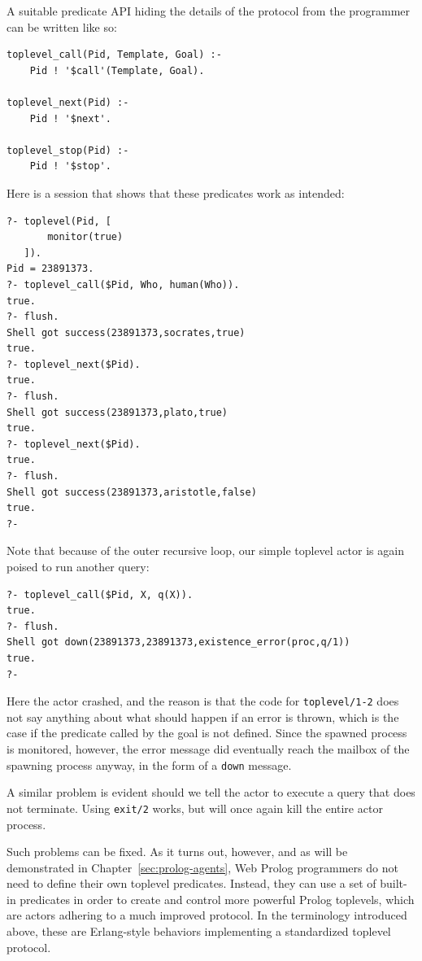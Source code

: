 \noindent A suitable predicate API hiding the details of the protocol from the programmer can be written like so:

\begin{verbatim}
toplevel_call(Pid, Template, Goal) :-
    Pid ! '$call'(Template, Goal).

toplevel_next(Pid) :-
    Pid ! '$next'.

toplevel_stop(Pid) :-
    Pid ! '$stop'.
\end{verbatim} 

\noindent Here is a session that shows that these predicates work as intended:

\begin{verbatim}
?- toplevel(Pid, [
       monitor(true)
   ]).
Pid = 23891373.
?- toplevel_call($Pid, Who, human(Who)).
true.
?- flush.
Shell got success(23891373,socrates,true)
true.
?- toplevel_next($Pid).
true.
?- flush.
Shell got success(23891373,plato,true)
true.
?- toplevel_next($Pid).
true.
?- flush.
Shell got success(23891373,aristotle,false)
true.
?-
\end{verbatim}

\noindent Note that because of the outer recursive loop, our simple toplevel actor is again poised to run another query:

\begin{verbatim}
?- toplevel_call($Pid, X, q(X)).
true.
?- flush.
Shell got down(23891373,23891373,existence_error(proc,q/1))
true.
?-
\end{verbatim}

\noindent Here the actor crashed, and the reason is that the code for \texttt{toplevel/1-2} does not say anything about what should happen if an error is thrown, which is the case if the predicate called by the goal is not defined. Since the spawned process is monitored, however, the error message did eventually reach the mailbox of the spawning process anyway, in the form of a \texttt{down} message.

A similar problem is evident should we tell the actor to execute a query that does not terminate. Using \texttt{exit/2} works, but will once again kill the entire actor process.

Such problems can be fixed. As it turns out, however, and as will be demonstrated in Chapter~\ref{sec:prolog-agents}, Web Prolog programmers do not need to define their own toplevel predicates. Instead, they can use a set of built-in predicates in order to create and control more powerful Prolog toplevels, which are actors adhering to a much improved protocol. In the terminology introduced above, these are Erlang-style behaviors implementing a standardized toplevel protocol.

